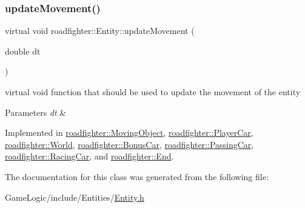 \mbox{\label{classroadfighter_1_1Entity_a66614a11004d6f9516473f60b530f689}} 
\subsubsection{\texorpdfstring{update\+Movement()}{updateMovement()}}
{\footnotesize\ttfamily virtual void roadfighter\+::\+Entity\+::update\+Movement (\begin{DoxyParamCaption}\item[{double}]{dt }\end{DoxyParamCaption})\hspace{0.3cm}{\ttfamily [pure virtual]}}

virtual void function that should be used to update the movement of the entity 
\begin{DoxyParams}{Parameters}
{\em dt} & \\
\hline
\end{DoxyParams}


Implemented in \hyperlink{classroadfighter_1_1MovingObject_ac1918d96dac118c4bd7d99168d92867c}{roadfighter\+::\+Moving\+Object}, \hyperlink{classroadfighter_1_1PlayerCar_aa1dcbec01dde1b212e4919b61338edde}{roadfighter\+::\+Player\+Car}, \hyperlink{classroadfighter_1_1World_a880776b589376b1b4fd5ed4f26de4482}{roadfighter\+::\+World}, \hyperlink{classroadfighter_1_1BonusCar_a2d3d584ca34a5df3b3c833123a9bbc30}{roadfighter\+::\+Bonus\+Car}, \hyperlink{classroadfighter_1_1PassingCar_ade5ebca5d7dbdb75bd9eee5817972363}{roadfighter\+::\+Passing\+Car}, \hyperlink{classroadfighter_1_1RacingCar_a2e8f3c63381a1fe432cddcc1f34fb935}{roadfighter\+::\+Racing\+Car}, and \hyperlink{classroadfighter_1_1End_a6ea4afe8b07f96801fb2a67b82d6b71c}{roadfighter\+::\+End}.



The documentation for this class was generated from the following file\+:\begin{DoxyCompactItemize}
\item 
Game\+Logic/include/\+Entities/\hyperlink{Entity_8h}{Entity.\+h}\end{DoxyCompactItemize}
